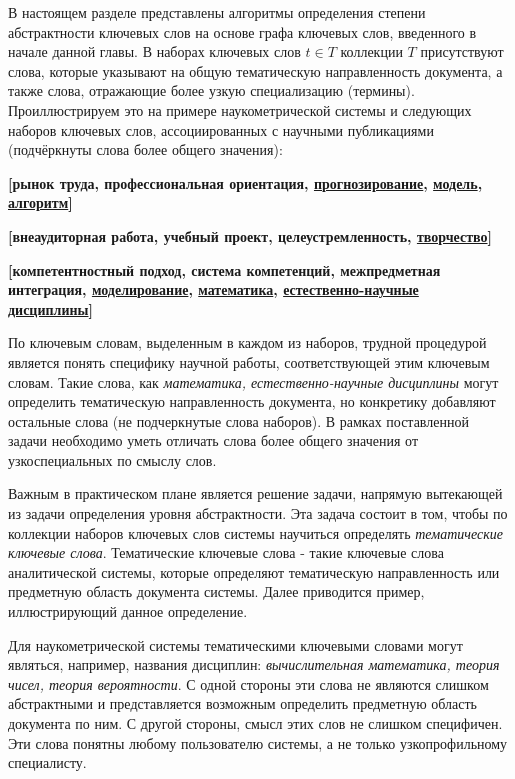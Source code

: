 В настоящем разделе представлены алгоритмы определения степени абстрактности ключевых слов на основе графа ключевых слов, введенного в начале данной главы. В наборах ключевых слов $t \in T$ коллекции $T$ присутствуют слова, которые
указывают на общую тематическую направленность документа, а также слова, отражающие более узкую специализацию (термины). Проиллюстрируем это на примере наукометрической системы и следующих наборов ключевых слов, ассоциированных с научными публикациями (подчёркнуты слова более общего значения):

    \textbf{[рынок труда, профессиональная ориентация, \underline{прогнозирование}, \underline{модель}, \underline{алгоритм}]}\

    \textbf{[внеаудиторная работа, учебный проект, целеустремленность, \underline{творчество}]}\

    \textbf{[компетентностный подход, система компетенций, межпредметная интеграция, \underline{моделирование}, \underline{математика}, \underline{естественно-научные дисциплины}]}\

По ключевым словам, выделенным в каждом из наборов, трудной процедурой является понять специфику научной работы, соответствующей этим ключевым словам. Такие слова, как \emph{математика, естественно-научные дисциплины} могут определить тематическую направленность документа, но конкретику добавляют остальные слова (не подчеркнутые слова наборов). В рамках поставленной задачи необходимо уметь отличать слова более общего значения от узкоспециальных по смыслу слов. 
    
Важным в практическом плане является решение задачи, напрямую вытекающей из задачи определения уровня абстрактности. Эта задача состоит в том, чтобы по коллекции наборов ключевых слов системы научиться определять \emph{тематические ключевые слова}. Тематические ключевые слова - такие ключевые слова аналитической системы, которые определяют тематическую направленность или предметную область документа системы. Далее приводится пример, иллюстрирующий данное определение.

Для наукометрической системы тематическими ключевыми словами могут являться, например, названия дисциплин: \emph{вычислительная математика, теория чисел, теория вероятности}. С одной стороны эти слова не являются слишком абстрактными и представляется возможным определить предметную область документа по ним. С другой стороны, смысл этих слов не слишком специфичен. Эти слова понятны любому пользователю системы, а не только узкопрофильному специалисту.

